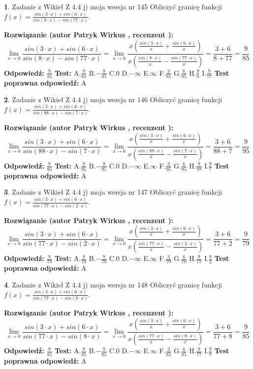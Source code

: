 \documentclass[12pt, a4paper]{article}
\theoremstyle{definition} %
\newtheorem{zad}{}
\newcommand{\zadStart}[1]{\begin{zad}#1\newline}
\newcommand{\zadStop}{\end{zad}}
\newcommand{\rozwStart}[2]{\noindent \textbf{Rozwiązanie (autor #1 , recenzent #2): }\newline}
\newcommand{\rozwStop}{\newline}
\newcommand{\odpStart}{\noindent \textbf{Odpowiedź:}\newline}
\newcommand{\odpStop}{\newline}
\newcommand{\testStart}{\noindent \textbf{Test:}\newline}
\newcommand{\testStop}{\newline}
\newcommand{\kluczStart}{\noindent \textbf{Test poprawna odpowiedź:}\newline}
\newcommand{\kluczStop}{\newline}
\begin{document}
\zadStart{Zadanie z Wikieł Z 4.4 j) moja wersja nr 145}
Obliczyć granicę funkcji $f(x)=\frac{sin(3\cdot x) +sin(6\cdot x)}{sin(8\cdot x) -sin(77\cdot x)}$.
\zadStop
\rozwStart{Patryk Wirkus}{}
$$\lim\limits_{x\to 0}\frac{sin(3\cdot x) +sin(6\cdot x)}{sin(8\cdot x) -sin(77\cdot x)}=\lim\limits_{x\to 0}\frac{x(\frac{sin(3\cdot x)}{x}+\frac{sin(6\cdot x)}{x})}{x(\frac{sin(8\cdot x)}{x}-\frac{sin(77\cdot x)}{x})}=\frac{3+6}{8+77} = \frac{9}{85}$$
\rozwStop
\odpStart
$\frac{9}{85}$
\odpStop
\testStart
A.$\frac{9}{85}$
B.$-\frac{9}{85}$
C.$0$
D.$-\infty$
E.$\infty$
F.$\frac{3}{85}$
G.$\frac{6}{85}$
H.$\frac{9}{8}$
I.$\frac{9}{77}$
\testStop
\kluczStart
A
\kluczStop



\zadStart{Zadanie z Wikieł Z 4.4 j) moja wersja nr 146}
Obliczyć granicę funkcji $f(x)=\frac{sin(3\cdot x) +sin(6\cdot x)}{sin(88\cdot x) -sin(7\cdot x)}$.
\zadStop
\rozwStart{Patryk Wirkus}{}
$$\lim\limits_{x\to 0}\frac{sin(3\cdot x) +sin(6\cdot x)}{sin(88\cdot x) -sin(7\cdot x)}=\lim\limits_{x\to 0}\frac{x(\frac{sin(3\cdot x)}{x}+\frac{sin(6\cdot x)}{x})}{x(\frac{sin(88\cdot x)}{x}-\frac{sin(7\cdot x)}{x})}=\frac{3+6}{88+7} = \frac{9}{95}$$
\rozwStop
\odpStart
$\frac{9}{95}$
\odpStop
\testStart
A.$\frac{9}{95}$
B.$-\frac{9}{95}$
C.$0$
D.$-\infty$
E.$\infty$
F.$\frac{3}{95}$
G.$\frac{6}{95}$
H.$\frac{9}{88}$
I.$\frac{9}{7}$
\testStop
\kluczStart
A
\kluczStop



\zadStart{Zadanie z Wikieł Z 4.4 j) moja wersja nr 147}
Obliczyć granicę funkcji $f(x)=\frac{sin(3\cdot x) +sin(6\cdot x)}{sin(77\cdot x) -sin(2\cdot x)}$.
\zadStop
\rozwStart{Patryk Wirkus}{}
$$\lim\limits_{x\to 0}\frac{sin(3\cdot x) +sin(6\cdot x)}{sin(77\cdot x) -sin(2\cdot x)}=\lim\limits_{x\to 0}\frac{x(\frac{sin(3\cdot x)}{x}+\frac{sin(6\cdot x)}{x})}{x(\frac{sin(77\cdot x)}{x}-\frac{sin(2\cdot x)}{x})}=\frac{3+6}{77+2} = \frac{9}{79}$$
\rozwStop
\odpStart
$\frac{9}{79}$
\odpStop
\testStart
A.$\frac{9}{79}$
B.$-\frac{9}{79}$
C.$0$
D.$-\infty$
E.$\infty$
F.$\frac{3}{79}$
G.$\frac{6}{79}$
H.$\frac{9}{77}$
I.$\frac{9}{2}$
\testStop
\kluczStart
A
\kluczStop



\zadStart{Zadanie z Wikieł Z 4.4 j) moja wersja nr 148}
Obliczyć granicę funkcji $f(x)=\frac{sin(3\cdot x) +sin(6\cdot x)}{sin(77\cdot x) -sin(8\cdot x)}$.
\zadStop
\rozwStart{Patryk Wirkus}{}
$$\lim\limits_{x\to 0}\frac{sin(3\cdot x) +sin(6\cdot x)}{sin(77\cdot x) -sin(8\cdot x)}=\lim\limits_{x\to 0}\frac{x(\frac{sin(3\cdot x)}{x}+\frac{sin(6\cdot x)}{x})}{x(\frac{sin(77\cdot x)}{x}-\frac{sin(8\cdot x)}{x})}=\frac{3+6}{77+8} = \frac{9}{85}$$
\rozwStop
\odpStart
$\frac{9}{85}$
\odpStop
\testStart
A.$\frac{9}{85}$
B.$-\frac{9}{85}$
C.$0$
D.$-\infty$
E.$\infty$
F.$\frac{3}{85}$
G.$\frac{6}{85}$
H.$\frac{9}{77}$
I.$\frac{9}{8}$
\testStop
\kluczStart
A
\kluczStop
\end{document}
